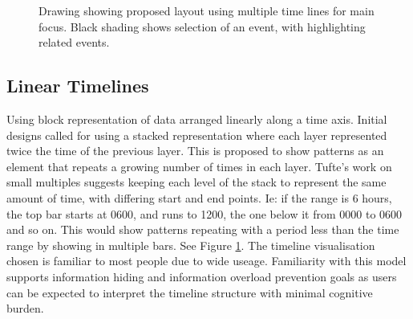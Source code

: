 \begin{figure}[tbh]
\caption{\protect\label{lines}Drawing showing proposed layout using multiple time lines for main focus. Black shading shows selection of an event, with highlighting related events.}
\end{figure}

\subsection{Linear Timelines}\label{des_timelines}
Using block representation of data arranged linearly along a time axis.
Initial designs called for using a stacked representation where each layer represented twice the time of the previous layer. This is proposed to show patterns as an element that repeats a growing number of times in each layer.
Tufte's work on small multiples \cite{tufte1983visual} suggests keeping each level of the stack to represent the same amount of time, with differing start and end points. Ie: if the range is 6 hours, the top bar starts at 0600, and runs to 1200, the one below it from 0000 to 0600 and so on. This would show patterns repeating with a period less than the time range by showing in multiple bars. See Figure \ref{lines}. The timeline visualisation chosen is familiar to most people due to wide useage. Familiarity with this model supports information hiding and information overload prevention goals as users can be expected to interpret the timeline structure with minimal cognitive burden. 

